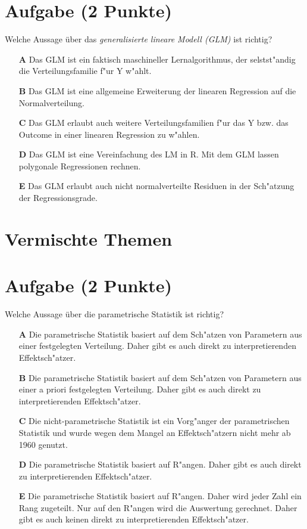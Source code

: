 \documentclass[a4paper, 9pt]{scrartcl}\usepackage[]{graphicx}\usepackage[]{xcolor}
\begin{document}
\section{Aufgabe \hfill (2 Punkte)}

Welche Aussage {\"u}ber das \textit{generalisierte lineare Modell (GLM)} ist richtig?  



\begin{enumerate}
\item [\textbf{A} \msquare] Das GLM ist ein faktisch maschineller Lernalgorithmus, der selstst{"a}ndig die Verteilungsfamilie f{"u}r Y w{"a}hlt.
\item [\textbf{B} \msquare] Das GLM ist eine allgemeine Erweiterung der linearen Regression auf die Normalverteilung.
\item [\textbf{C} \msquare] Das GLM erlaubt auch weitere Verteilungsfamilien f{"u}r das Y bzw. das Outcome in einer linearen Regression zu w{"a}hlen.
\item [\textbf{D} \msquare] Das GLM ist eine Vereinfachung des LM in R. Mit dem GLM lassen polygonale Regressionen rechnen.
\item [\textbf{E} \msquare] Das GLM erlaubt auch nicht normalverteilte Residuen in der Sch{"a}tzung der Regressionsgrade.
\end{enumerate}
\section*{Vermischte Themen}  

\section{Aufgabe \hfill (2 Punkte)}




Welche Aussage {\"u}ber die parametrische Statistik ist richtig?



\begin{enumerate}
\item [\textbf{A} \msquare] Die parametrische Statistik basiert auf dem Sch{"a}tzen von Parametern aus einer festgelegten Verteilung. Daher gibt es auch direkt zu interpretierenden Effektsch{"a}tzer.
\item [\textbf{B} \msquare] Die parametrische Statistik basiert auf dem Sch{"a}tzen von Parametern aus einer a priori festgelegten Verteilung. Daher gibt es auch direkt zu interpretierenden Effektsch{"a}tzer.
\item [\textbf{C} \msquare] Die nicht-parametrische Statistik ist ein Vorg{"a}nger der parametrischen Statistik und wurde wegen dem Mangel an Effektsch{"a}tzern nicht mehr ab 1960 genutzt.
\item [\textbf{D} \msquare] Die parametrische Statistik basiert auf R{"a}ngen. Daher gibt es auch direkt zu interpretierenden Effektsch{"a}tzer.
\item [\textbf{E} \msquare] Die parametrische Statistik basiert auf R{"a}ngen. Daher wird jeder Zahl ein Rang zugeteilt. Nur auf den R{"a}ngen wird die Auswertung gerechnet. Daher gibt es auch keinen direkt zu interpretierenden Effektsch{"a}tzer.
\end{enumerate}
\end{document}
